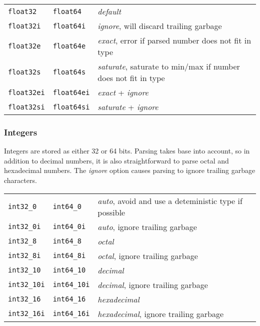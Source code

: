 \begin{tabular}{lll}
\texttt{float32} & \texttt{float64} & \emph{default}\\
\texttt{float32i} & \texttt{float64i} & \emph{ignore}, will discard trailing garbage\\
\texttt{float32e} & \texttt{float64e} & \emph{exact}, error if parsed number does not fit in type \\
\texttt{float32s} & \texttt{float64s} & \emph{saturate}, saturate to min/max if number does not fit in type \\
\texttt{float32ei} & \texttt{float64ei} & \emph{exact} + \emph{ignore} \\
\texttt{float32si} & \texttt{float64si} & \emph{saturate} + \emph{ignore} \\
\end{tabular}

\subsubsection{Integers}
Integers are stored as either 32 or 64 bits.  Parsing takes base into
account, so in addition to decimal numbers, it is also straightforward
to parse octal and hexadecimal numbers.  The \emph{ignore} option
causes parsing to ignore trailing garbage characters.\\

\begin{tabular}{lll}
  \texttt{int32\_0}   & \texttt{int64\_0}   & \emph{auto}, avoid and use a deteministic type if possible \\
  \texttt{int32\_0i}  & \texttt{int64\_0i}  & \emph{auto}, ignore trailing garbage \\
  \texttt{int32\_8}   & \texttt{int64\_8}   & \emph{octal} \\
  \texttt{int32\_8i}  & \texttt{int64\_8i}  & \emph{octal}, ignore trailing garbage \\
  \texttt{int32\_10}  & \texttt{int64\_10}  & \emph{decimal} \\
  \texttt{int32\_10i} & \texttt{int64\_10i} & \emph{decimal}, ignore trailing garbage \\
  \texttt{int32\_16}  & \texttt{int64\_16}  & \emph{hexadecimal} \\
  \texttt{int32\_16i} & \texttt{int64\_16i} & \emph{hexadecimal}, ignore trailing garbage \\
\end{tabular}



